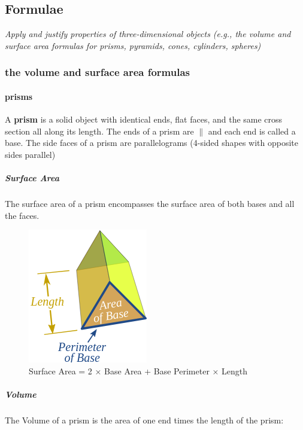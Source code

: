 \subsection[formulae]{Formulae}

\textit{Apply and justify properties of three-dimensional objects (e.g., the volume and surface area
formulas for prisms, pyramids, cones, cylinders, spheres)}

\subsubsection[formulae]{the volume and surface area formulas} 

\paragraph*{prisms}

A \textbf{prism} is a solid object with identical ends, flat faces, and the same cross section all along its length. The ends of a prism are $\parallel$ and each end is called a base. The side faces of a prism are parallelograms
(4-sided shapes with opposite sides parallel)

\vspace{2cm}


\vspace{2cm}
\subparagraph*{Surface Area} The surface area of a prism encompasses the surface area of both bases and all the faces.


\begin{figure}[h!]
    \begin{center}
        \includegraphics[scale=.45]{./public/images/prism-surface-area}
        \caption{Surface Area =  2 × Base Area
        + Base Perimeter × Length}
    \end{center}
\end{figure}

\subparagraph*{Volume} The Volume of a prism is the area of one end times the length of the prism:


